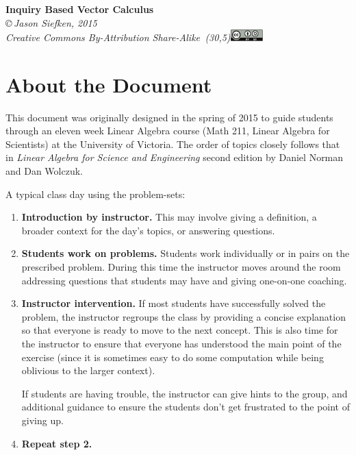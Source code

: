 \documentclass[letter]{article}
\begin{document}
\pagestyle{empty}

\begin{center}
{\huge\bf Inquiry Based Vector Calculus}\\

\vspace{.7in}
{
\it \copyright\,Jason Siefken, 2015 \\
Creative Commons By-Attribution Share-Alike\, \makebox(30,5){\includegraphics[height=1.2em]{by-sa.pdf}}
}
\end{center}

\section*{About the Document}
This document was originally designed in the spring of 2015 to guide students
through an eleven week Linear Algebra course (Math 211, Linear Algebra for Scientists) at
the University of Victoria.  The order of topics closely follows that in {\it Linear
Algebra for Science and Engineering} second edition by Daniel Norman and Dan Wolczuk.

A typical class day using the problem-sets:
\begin{enumerate}
	\item {\bf Introduction by instructor.} This may involve giving a definition,
		a broader context for the day's topics, or answering questions.
	\item {\bf Students work on problems.} Students work individually or in pairs
		on the prescribed problem.  During this time the instructor moves around
		the room addressing questions that students may have and giving one-on-one
		coaching.
	\item {\bf Instructor intervention.} If most students have successfully solved the 
		problem, the instructor regroups the class by providing a concise 
		explanation so that everyone is ready to move to the next concept.  This
		is also time for the instructor to ensure that everyone has understood the
		main point of the exercise (since it is sometimes easy to do some computation
		while being oblivious to the larger context).

		If students are having trouble, the instructor can give hints to the group,
		and additional guidance to ensure the students don't get frustrated
		to the point of giving up.
	\item {\bf Repeat step 2.}
\end{enumerate}
\end{document}
